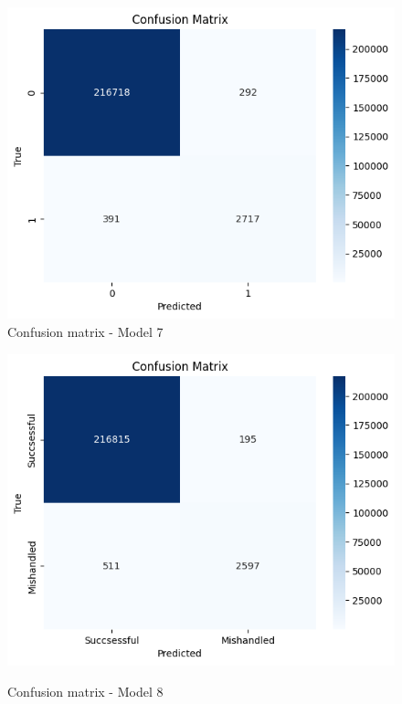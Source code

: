\documentclass[12pt]{article}
\begin{document}
\begin{figure}
\begin{minipage}[c]{0.45\linewidth}
\includegraphics[width=1\textwidth]{Confusion_matrix_Model 7.png}\\
\caption{Confusion matrix - Model 7}
\end{minipage}
\hfill
\begin{minipage}[c]{0.45\linewidth}
    \includegraphics[width=1\textwidth]{Confusion_matrix_Model 8.png}\\
    \caption{Confusion matrix - Model 8}
\end{minipage}%
\end{figure}
\end{document}
